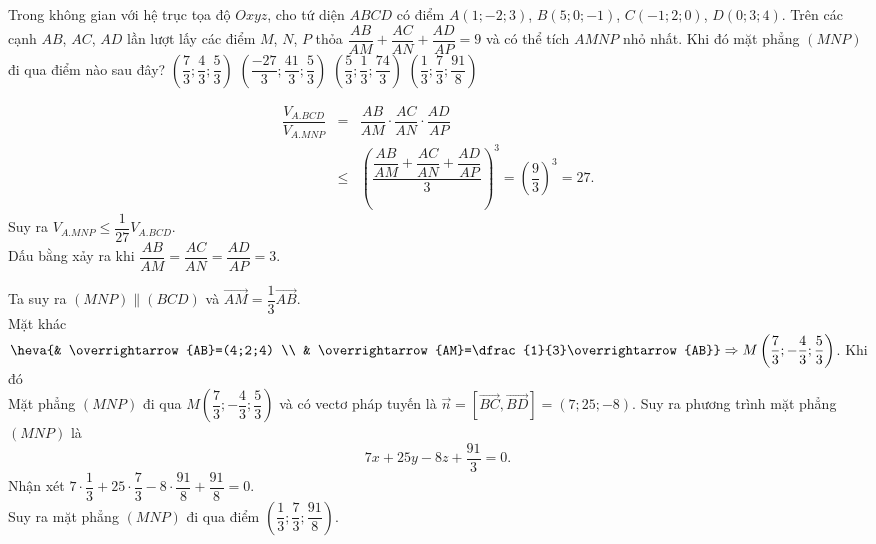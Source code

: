 \begin{ex}%
Trong không gian với hệ trục tọa độ $O x y z$, cho tứ diện $ABCD$ có điểm $A(1;-2;3)$, $B(5;0;-1)$, $C(-1;2;0)$, $D(0;3;4)$. Trên các cạnh $AB$, $AC$, $AD$ lần lượt lấy các điểm $M$, $N$, $P$ thỏa $\dfrac{AB}{AM}+\dfrac{AC}{AN}+\dfrac{AD}{AP}=9$ và có thể tích $AMNP$ nhỏ nhất. Khi đó mặt phẳng $(MNP)$ đi qua điểm nào sau đây?
\choice
{$\left(\dfrac{7}{3};\dfrac{4}{3};\dfrac{5}{3}\right)$}
{$\left(\dfrac{-27}{3};\dfrac{41}{3};\dfrac{5}{3}\right)$}
{$\left(\dfrac{5}{3};\dfrac{1}{3};\dfrac{74}{3}\right)$}
{\True $\left(\dfrac{1}{3};\dfrac{7}{3};\dfrac{91}{8}\right)$}
\loigiai
{
\immini
{
	\begin{eqnarray*}
		\dfrac{V_{A.BCD}}{V_{A.MNP}}&=&\dfrac{AB}{AM}\cdot\dfrac{AC}{AN}\cdot\dfrac{AD}{AP}\\
		&\le&\left(\dfrac{\dfrac{AB}{AM}+\dfrac{AC}{AN}+\dfrac{AD}{AP}}{3}\right)^3=\left(\dfrac{9}{3}\right)^3=27.
	\end{eqnarray*}
Suy ra $V_{A.MNP}\leq\dfrac{1}{27}V_{A.BCD}$.\\
Dấu bằng xảy ra khi $\dfrac{AB}{AM}=\dfrac{AC}{AN}=\dfrac{AD}{AP}=3$.
}
{
}
	\noindent Ta suy ra $(MNP)\parallel (BCD)$ và $\overrightarrow{AM}=\dfrac{1}{3}\overrightarrow{AB}$.\\
	Mặt khác $\heva{& \overrightarrow{AB}=(4;2;4) \\ & \overrightarrow{AM}=\dfrac{1}{3}\overrightarrow{AB}}\Rightarrow M\left(\dfrac{7}{3};-\dfrac{4}{3};\dfrac{5}{3}\right)$. Khi đó\\
	Mặt phẳng $(MNP)$ đi qua $M\left(\dfrac{7}{3};-\dfrac{4}{3};\dfrac{5}{3}\right)$ và có vectơ pháp tuyến là $\overrightarrow{n}=[\overrightarrow{BC},\overrightarrow{BD}]=(7;25;-8)$. Suy ra phương trình mặt phẳng $(MNP)$ là
	\[7x+25y-8z+\dfrac{91}{3}=0.\]
	Nhận xét $7\cdot \dfrac{1}{3}+25\cdot \dfrac{7}{3}-8\cdot\dfrac{91}{8}+\dfrac{91}{8}=0$.\\
	Suy ra mặt phẳng $(MNP)$ đi qua điểm $\left(\dfrac{1}{3}; \dfrac{7}{3}; \dfrac{91}{8}\right)$.
}
\end{ex}

